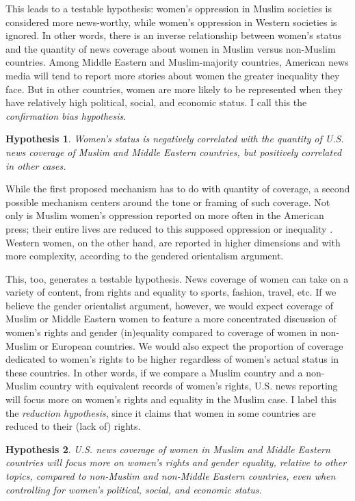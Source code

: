 \documentclass[11pt, oneside]{article}
\newtheorem{hypothesis}{Hypothesis}
\begin{document}
This leads to a testable hypothesis: women's oppression in Muslim societies is considered more news-worthy, while women's oppression in Western societies is ignored. In other words, there is an inverse relationship between women's status and the quantity of news coverage about women in Muslim versus non-Muslim countries. Among Middle Eastern and Muslim-majority countries, American news media will tend to report more stories about women the greater inequality they face. But in other countries, women are more likely to be represented when they have relatively high political, social, and economic status. I call this the \emph{confirmation bias hypothesis}.

\begin{hypothesis}
Women's status is negatively correlated with the quantity of U.S. news coverage of Muslim and Middle Eastern countries, but positively correlated in other cases.
\end{hypothesis}

While the first proposed mechanism has to do with quantity of coverage, a second possible mechanism centers around the tone or framing of such coverage. Not only is Muslim women's oppression reported on more often in the American press; their entire lives are reduced to this supposed oppression or inequality \cite{ryan2011muslim,abu2013muslim}. Western women, on the other hand, are reported in higher dimensions and with more complexity, according to the gendered orientalism argument.

This, too, generates a testable hypothesis. News coverage of women can take on a variety of content, from rights and equality to sports, fashion, travel, etc. If we believe the gender orientalist argument, however, we would expect coverage of Muslim or Middle Eastern women to feature a more concentrated discussion of women's rights and gender (in)equality compared to coverage of women in non-Muslim or European countries. We would also expect the proportion of coverage dedicated to women's rights to be higher regardless of women's actual status in these countries. In other words, if we compare a Muslim country and a non-Muslim country with equivalent records of women's rights, U.S. news reporting will focus more on women's rights and equality in the Muslim case. I label this the \emph{reduction hypothesis}, since it claims that women in some countries are reduced to their (lack of) rights.

\begin{hypothesis}
U.S. news coverage of women in Muslim and Middle Eastern countries will focus more on women's rights and gender equality, relative to other topics, compared to non-Muslim and non-Middle Eastern countries, even when controlling for women's political, social, and economic status.
\end{hypothesis}
\end{document}

